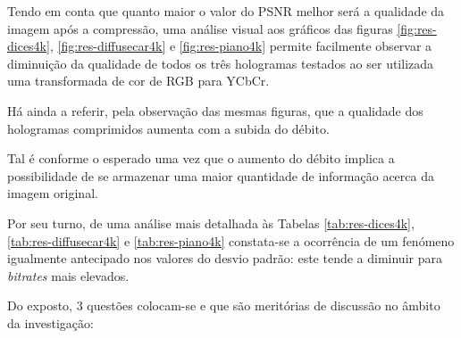 Tendo em conta que quanto maior o valor do \ac{PSNR} melhor será a qualidade da imagem após a compressão, uma análise visual aos gráficos das figuras \ref{fig:res-dices4k}, \ref{fig:res-diffusecar4k} e \ref{fig:res-piano4k} permite facilmente observar a diminuição da qualidade de todos os três hologramas testados ao ser utilizada uma transformada de cor de \ac{RGB} para YCbCr.

Há ainda a referir, pela observação das mesmas figuras, que a qualidade dos hologramas comprimidos aumenta com a subida do débito.

    Tal é conforme o esperado uma vez que o aumento do débito implica a possibilidade de se armazenar uma maior quantidade de informação acerca da imagem original.

Por seu turno, de uma análise mais detalhada às Tabelas \ref{tab:res-dices4k}, \ref{tab:res-diffusecar4k} e \ref{tab:res-piano4k} constata-se a ocorrência de um fenómeno igualmente antecipado nos valores do desvio padrão: este tende a diminuir para \textit{bitrates} mais elevados.



Do exposto, 3 questões colocam-se e que são meritórias de discussão no âmbito da investigação:

